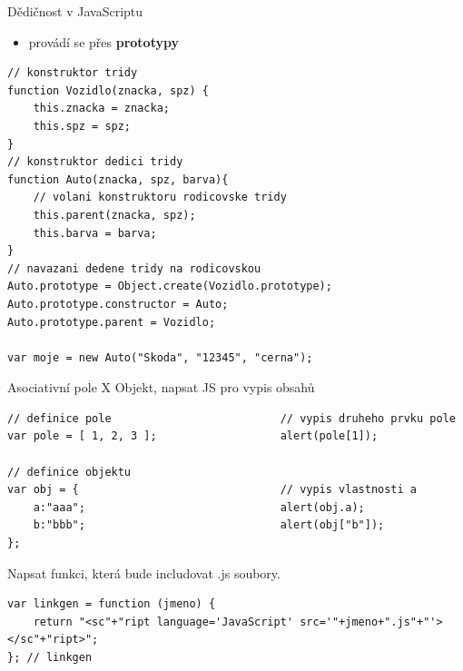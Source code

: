 \documentclass[12pt,a4paper,titlepage,final]{article}
\begin{document}
\begin{enumerate}
	{\large \item Dědičnost v JavaScriptu}
	\begin{itemize}
		\item provádí se přes \textbf{prototypy} 
	\end{itemize}
	\begin{verbatim}
// konstruktor tridy
function Vozidlo(znacka, spz) {
    this.znacka = znacka;
    this.spz = spz;
}
// konstruktor dedici tridy
function Auto(znacka, spz, barva){
    // volani konstruktoru rodicovske tridy
    this.parent(znacka, spz);
    this.barva = barva;
}
// navazani dedene tridy na rodicovskou
Auto.prototype = Object.create(Vozidlo.prototype);
Auto.prototype.constructor = Auto;
Auto.prototype.parent = Vozidlo;

var moje = new Auto("Skoda", "12345", "cerna");
	\end{verbatim}
	
	{\large \item Asociativní pole X Objekt, napsat JS pro vypis obsahů}
	\begin{verbatim}
// definice pole                          // vypis druheho prvku pole
var pole = [ 1, 2, 3 ];                   alert(pole[1]);
		
// definice objektu
var obj = {                               // vypis vlastnosti a
    a:"aaa";                              alert(obj.a);   
    b:"bbb";                              alert(obj["b"]);
};
	\end{verbatim}
	
	{\large \item Napsat funkci, která bude includovat .js soubory.}
	\begin{verbatim}
var linkgen = function (jmeno) {
    return "<sc"+"ript language='JavaScript' src='"+jmeno+".js"+"'></sc"+"ript>";
}; // linkgen		
	\end{verbatim}
	
\end{enumerate}
\end{document}
